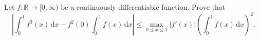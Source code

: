 Let \(f \colon \mathbb{R} \to [0,\infty)\) be a continuously differentiable function. Prove that
\[
\left| \int_0^1 f^3 (x) \,\mathrm{d}x - f^2 (0) \int_0^1 f (x) \,\mathrm{d}x \right| \le \max_{0 \le x \le 1} |f'(x)| \left( \int_0^1 f (x) \,\mathrm{d}x \right)^2 .
\]
